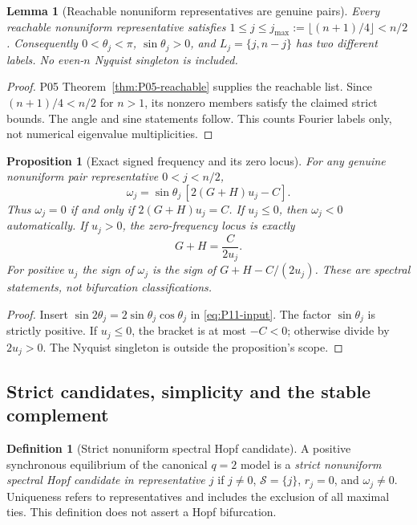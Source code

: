 \documentclass[11pt]{article}
\newtheorem{lemma}[theorem]{Lemma}
\newtheorem{proposition}[theorem]{Proposition}
\theoremstyle{definition}
\newtheorem{definition}[theorem]{Definition}
\theoremstyle{remark}
\begin{document}
\begin{lemma}[Reachable nonuniform representatives are genuine pairs]
\label{lem:P11-pairs}
Every reachable nonuniform representative satisfies
$1\le j\le j_{\max}:=\lfloor(n+1)/4\rfloor<n/2$.
Consequently $0<\theta_j<\pi$, $\sin\theta_j>0$, and
$L_j=\{j,n-j\}$ has two different labels. No even-$n$ Nyquist
singleton is included.
\end{lemma}
\begin{proof}
P05 Theorem~\ref{thm:P05-reachable} supplies the reachable list.
Since $(n+1)/4<n/2$ for $n>1$, its nonzero members satisfy the
claimed strict bounds. The angle and sine statements follow.
This counts Fourier labels only, not numerical eigenvalue multiplicities.
\end{proof}

\begin{proposition}[Exact signed frequency and its zero locus]
\label{prop:P11-frequency}
For any genuine nonuniform pair representative $0<j<n/2$,
\begin{equation}
 \boxed{\omega_j=\sin\theta_j\,[2(G+H)u_j-C].}
 \label{eq:P11-frequency}
\end{equation}
Thus $\omega_j=0$ if and only if $2(G+H)u_j=C$.
If $u_j\le0$, then $\omega_j<0$ automatically. If $u_j>0$,
the zero-frequency locus is exactly
\begin{equation}
 G+H=\frac{C}{2u_j}.
 \label{eq:P11-zero-frequency}
\end{equation}
For positive $u_j$ the sign of $\omega_j$ is the sign of
$G+H-C/(2u_j)$. These are spectral statements, not bifurcation classifications.
\end{proposition}
\begin{proof}
Insert $\sin2\theta_j=2\sin\theta_j\cos\theta_j$ in
\eqref{eq:P11-input}. The factor $\sin\theta_j$ is strictly positive.
If $u_j\le0$, the bracket is at most $-C<0$; otherwise divide by
$2u_j>0$. The Nyquist singleton is outside the proposition's scope.
\end{proof}

\subsection{Strict candidates, simplicity and the stable complement}
\label{slot:P11-2}
\begin{definition}[Strict nonuniform spectral Hopf candidate]
\label{def:P11-candidate}
A positive synchronous equilibrium of the canonical $q=2$ model is a
\emph{strict nonuniform spectral Hopf candidate in representative $j$}
if $j\ne0$, $\mathcal S=\{j\}$, $r_j=0$, and $\omega_j\ne0$.
Uniqueness refers to representatives and includes the exclusion of all
maximal ties. This definition does not assert a Hopf bifurcation.
\end{definition}
\end{document}
